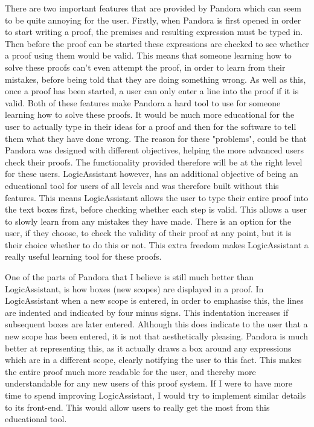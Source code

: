 There are two important features that are provided by Pandora which can seem to be quite annoying for the user. Firstly, when Pandora is first opened in order to start writing a proof, the premises and resulting expression must be typed in. Then before the proof can be started these expressions are checked to see whether a proof using them would be valid. This means that someone learning how to solve these proofs can't even attempt the proof, in order to learn from their mistakes, before being told that they are doing something wrong. As well as this, once a proof has been started, a user can only enter a line into the proof if it is valid. Both of these features make Pandora a hard tool to use for someone learning how to solve these proofs. It would be much more educational for the user to actually type in their ideas for a proof and then for the software to tell them what they have done wrong. The reason for these "problems", could be that Pandora was designed with different objectives, helping the more advanced users check their proofs. The functionality provided therefore will be at the right level for these users.  LogicAssistant however, has an additional objective of being an educational tool for users of all levels and was therefore built without this features. This means LogicAssistant allows the user to type their entire proof into the text boxes first, before checking whether each step is valid. This allows a user to slowly learn from any mistakes they have made. There is an option for the user, if they choose, to check the validity of their proof at any point, but it is their choice whether to do this or not. This extra freedom makes LogicAssistant a really useful learning tool for these proofs. 

One of the parts of Pandora that I believe is still much better than LogicAssistant, is how boxes (new scopes) are displayed in a proof. In LogicAssistant when a new scope is entered, in order to emphasise this, the lines are indented and indicated by four minus signs. This indentation increases if subsequent boxes are later entered. Although this does indicate to the user that a new scope has been entered, it is not that aesthetically pleasing. Pandora is much better at representing this, as it actually draws a box around any expressions which are in a different scope, clearly notifying the user to this fact. This makes the entire proof much more readable for the user, and thereby more understandable for any new users of this proof system. If I were to have more time to spend improving LogicAssistant, I would try to implement similar details to its front-end. This would allow users to really get the most from this educational tool. 

